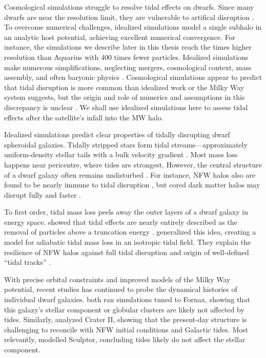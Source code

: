 Cosmological simulations struggle to resolve tidal effects on dwarfs.
Since many dwarfs are near the resolution limit, they are vulnerable to
artifical disruption
\citep[e.g.,][]{vandenbosch+2018, santos-santos+2025}. To overcome
numerical challenges, idealized simulations model a single subhalo in an
analytic host potential, achieving excellent numerical convergence. For
instance, the simulations we describe later in this thesis reach the
times higher resolution than Aquarius \citep{springel+2008} with 400
times fewer particles. Idealized simulations make numerous
simplifications, neglecting mergers, cosmological context, mass
assembly, and often baryonic physics
\citep[e.g.,][]{hayashi+2003, bullock+johnston2005, klimentowski+2009, ogiya+2019}.
Cosmological simulations appear to predict that tidal disruption is more
common than idealized work or the Milky Way system suggests, but the
origin and role of numerics and assumptions in this discrepancy is
unclear \citep[ \citet{riley+2024}]{panithanpaisal+2021, shipp+2023l}.
We shall use idealized simulations here to assess tidal effects after
the satellite's infall into the MW halo.

Idealized simulations predict clear properties of tidally disrupting
dwarf spheroidal galaxies. Tidally stripped stars form tidal
streams---approximately uniform-density stellar tails with a bulk
velocity gradient
\citep[e.g.,][]{moore+davis1994, johnston+spergel+hernquist1995, read+2006}.
Most mass loss happens near pericentre, where tides are strongest.
However, the central structure of a dwarf galaxy often remains
undisturbed \citep{oh+lin+aarseth1995, piatek+pryor1995}. For instance,
NFW halos also are found to be nearly immune to tidal disruption
\citep{EP2020}, but cored dark matter halos may disrupt fully and faster
\citep[e.g.,][]{penarrubia+2010, errani+2023a}.

To first order, tidal mass loss peels away the outer layers of a dwarf
galaxy in energy space.
\citet{drakos+taylor+benson2020, drakos+taylor+benson2022, amorisco2021}
showed that tidal effects are nearly entirely described as the removal
of particles above a truncation energy \citep[see
also][]{choi+weinberg+katz2009}. \citet{stucker+2023} generalized this
idea, creating a model for adiabatic tidal mass loss in an isotropic
tidal field. They explain the resilience of NFW halos against full tidal
disruption and origin of well-defined ``tidal tracks'' \citep[as
observed in][]{PNM2008, green+vandenbosch2019, EN2021}.

With precise orbital constraints and improved models of the Milky Way
potential, recent studies has continued to probe the dynamical histories
of individual dwarf galaxies.
\citet{borukhovetskaya+2022, dicintio+2024} both ran simulations tuned
to Fornax, showing that this galaxy's stellar component or globular
clusters are likely not affected by tides. Similarly,
\citet{borukhovetskaya+2022a} analyzed Crater II, showing that the
present-day structure is challenging to reconcile with NFW initial
conditions and Galactic tides. Most relevantly, \citet{iorio+2019}
modelled Sculptor, concluding tides likely do not affect the stellar
component.

